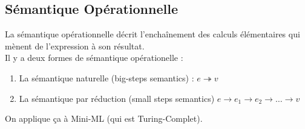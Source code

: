 \documentclass{cours}
\begin{document}
\subsection{Sémantique Opérationnelle}
La sémantique opérationnelle décrit l'enchaînement des calculs élémentaires qui mènent de l'expression à son résultat.\\
Il y a deux formes de sémantique opérationelle :
\begin{enumerate}
    \item La sémantique naturelle (big-steps semantics) : $e \twoheadrightarrow v$
    \item La sémantique par réduction (small steps semantics) $e \rightarrow e_{1} \rightarrow e_{2} \rightarrow \ldots \rightarrow v$
\end{enumerate}
On applique ça à Mini-ML (qui est Turing-Complet). 
\end{document}
